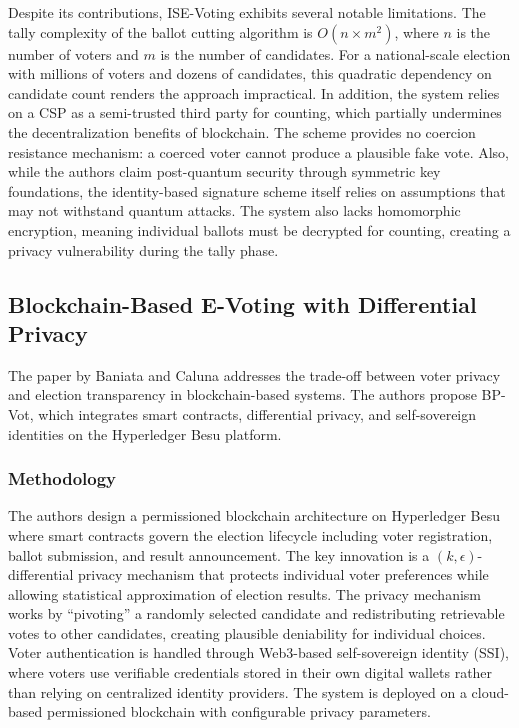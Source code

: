 Despite its contributions, ISE-Voting exhibits several notable limitations. The tally complexity of the ballot cutting algorithm is $O(n \times m^2)$, where $n$ is the number of voters and $m$ is the number of candidates. For a national-scale election with millions of voters and dozens of candidates, this quadratic dependency on candidate count renders the approach impractical. In addition, the system relies on a CSP as a semi-trusted third party for counting, which partially undermines the decentralization benefits of blockchain. The scheme provides no coercion resistance mechanism: a coerced voter cannot produce a plausible fake vote. Also, while the authors claim post-quantum security through symmetric key foundations, the identity-based signature scheme itself relies on assumptions that may not withstand quantum attacks. The system also lacks homomorphic encryption, meaning individual ballots must be decrypted for counting, creating a privacy vulnerability during the tally phase.

\subsection{Blockchain-Based E-Voting with Differential Privacy}
\label{subsec:bp-vot}

The paper by Baniata and Caluna \cite{bp_vot} addresses the trade-off between voter privacy and election transparency in blockchain-based systems. The authors propose BP-Vot, which integrates smart contracts, differential privacy, and self-sovereign identities on the Hyperledger Besu platform.

\subsubsection{Methodology}
\label{subsubsec:bp-method}

The authors design a permissioned blockchain architecture on Hyperledger Besu where smart contracts govern the election lifecycle including voter registration, ballot submission, and result announcement. The key innovation is a $(k, \epsilon)$-differential privacy mechanism that protects individual voter preferences while allowing statistical approximation of election results. The privacy mechanism works by ``pivoting'' a randomly selected candidate and redistributing retrievable votes to other candidates, creating plausible deniability for individual choices. Voter authentication is handled through Web3-based self-sovereign identity (SSI), where voters use verifiable credentials stored in their own digital wallets rather than relying on centralized identity providers. The system is deployed on a cloud-based permissioned blockchain with configurable privacy parameters.

